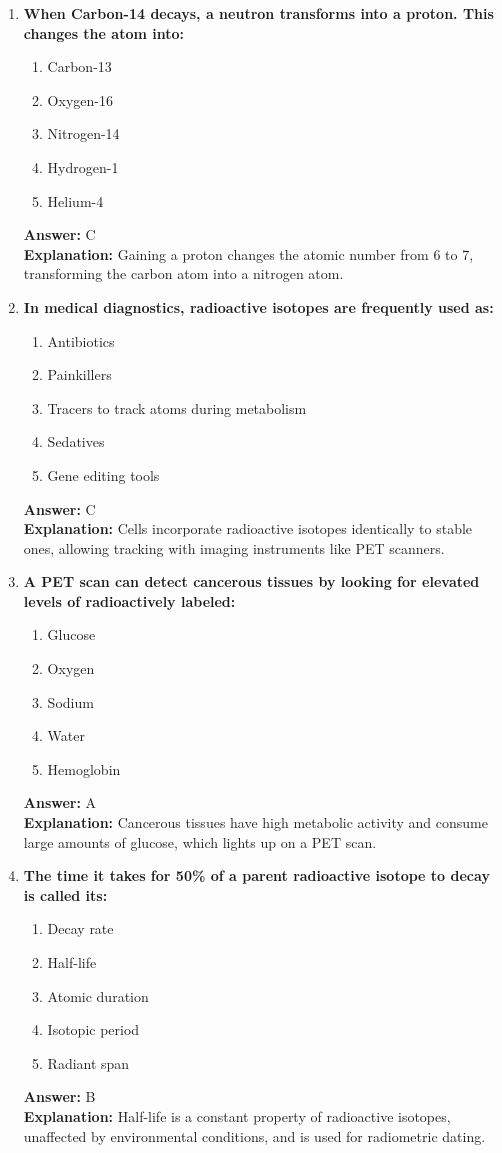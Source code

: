 \documentclass[11pt, a4paper]{article}
\begin{document}
\begin{enumerate}
\item \textbf{When Carbon-14 decays, a neutron transforms into a proton. This changes the atom into:}
\begin{enumerate}[label=\Alph*.]
    \item Carbon-13
    \item Oxygen-16
    \item Nitrogen-14
    \item Hydrogen-1
    \item Helium-4
\end{enumerate}
\textbf{Answer:} C \\
\textbf{Explanation:} Gaining a proton changes the atomic number from 6 to 7, transforming the carbon atom into a nitrogen atom.

\item \textbf{In medical diagnostics, radioactive isotopes are frequently used as:}
\begin{enumerate}[label=\Alph*.]
    \item Antibiotics
    \item Painkillers
    \item Tracers to track atoms during metabolism
    \item Sedatives
    \item Gene editing tools
\end{enumerate}
\textbf{Answer:} C \\
\textbf{Explanation:} Cells incorporate radioactive isotopes identically to stable ones, allowing tracking with imaging instruments like PET scanners.

\item \textbf{A PET scan can detect cancerous tissues by looking for elevated levels of radioactively labeled:}
\begin{enumerate}[label=\Alph*.]
    \item Glucose
    \item Oxygen
    \item Sodium
    \item Water
    \item Hemoglobin
\end{enumerate}
\textbf{Answer:} A \\
\textbf{Explanation:} Cancerous tissues have high metabolic activity and consume large amounts of glucose, which lights up on a PET scan.

\item \textbf{The time it takes for 50\% of a parent radioactive isotope to decay is called its:}
\begin{enumerate}[label=\Alph*.]
    \item Decay rate
    \item Half-life
    \item Atomic duration
    \item Isotopic period
    \item Radiant span
\end{enumerate}
\textbf{Answer:} B \\
\textbf{Explanation:} Half-life is a constant property of radioactive isotopes, unaffected by environmental conditions, and is used for radiometric dating.


\end{enumerate}
\end{document}
